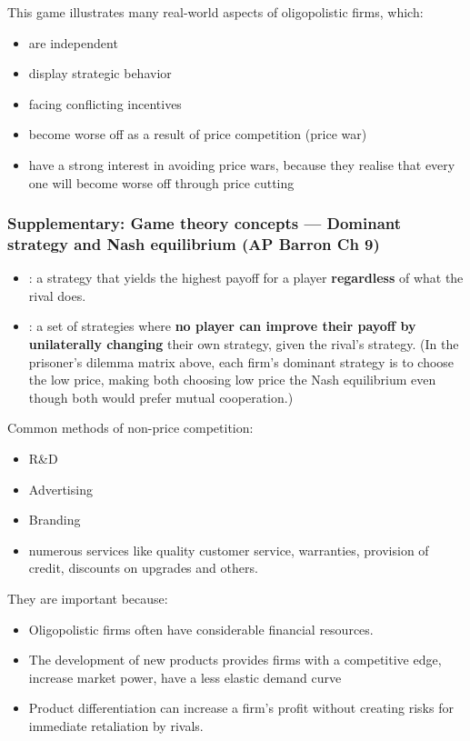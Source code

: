 This game illustrates many real-world aspects of oligopolistic firms, which:
\begin{itemize}
  \item are independent
  \item display strategic behavior
  \item facing conflicting incentives
  \item become worse off as a result of price competition (price war)
  \item have a strong interest in avoiding price wars, because they realise that every one will become worse off through price cutting
\end{itemize}
\subsubsection*{Supplementary: Game theory concepts --- Dominant strategy and Nash equilibrium (AP Barron Ch 9)}
\begin{itemize}
  \item {}: a strategy that yields the highest payoff for a player \textbf{regardless} of what the rival does.
  \item {}: a set of strategies where \textbf{no player can improve their payoff by unilaterally changing} their own strategy, given the rival's strategy. (In the prisoner's dilemma matrix above, each firm's dominant strategy is to choose the low price, making both choosing low price the Nash equilibrium even though both would prefer mutual cooperation.)
\end{itemize}
Common methods of non-price competition:
\begin{itemize}
  \item R\&D
  \item Advertising
  \item Branding
  \item numerous services like quality customer service, warranties, provision of credit, discounts on upgrades and others.
\end{itemize}
They are important because:
\begin{itemize}
  \item Oligopolistic firms often have considerable financial resources.
  \item The development of new products provides firms with a competitive edge, increase market power, have a less elastic demand curve
  \item Product differentiation can increase a firm's profit without creating risks for immediate retaliation by rivals.
\end{itemize}

